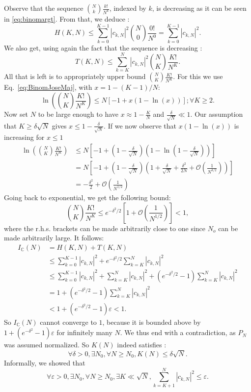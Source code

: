 \documentclass[aps,prl,showpacs,twocolumn]{revtex4-2}
\begin{document}
Observe that the sequence $\binom{N}{k}\frac{k!}{N^k}$, indexed by $k$, is decreasing as it can
be seen in \eqref{eq:binomargt}. From that, we deduce :
\[ H(K, N) \leq \sum_{k=0}^{K-1} |c_{k,N}|^2 \binom{N}{0} \frac{0!}{N^0} = \sum_{k=0}^{K-1} |c_{k,N}|^2.\]
We also get, using again the fact that the sequence is decreasing :
\[ T(K, N) \leq \sum_{k=K}^N |c_{k,N}|^2 \binom{N}{K} \frac{K!}{N^{K}}. \]
All that is left is to appropriately upper bound $\binom{N}{K} \frac{K!}{N^{K}}$. For this we use Eq.~\eqref{eq:BinomJoseMaj},
with $x = 1 - (K-1)/N$:
\[
    \ln \left( \binom{N}{K} \frac{K!}{N^K} \right) \leq N [ -1 + x(1 - \ln ( x )) ]; \forall K\geq 2.
\]
Now set $N$ to be large enough to have $x \approx 1 - \frac{K}{N}$ and $\frac{\delta}{\sqrt{N}} \ll 1$.
Our assumption that $K\geq \delta\sqrt{N}$ gives $x \leq 1 - \frac{\delta}{\sqrt{N}}$. If we now observe that $x(1-\ln(x))$ is increasing
for $x \leq 1$
\begin{align*}
    \ln \left( \binom{N}{K} \frac{K!}{N^{K}} \right)
    &\leq N \left[ -1 + \left( 1 - \frac{\delta}{\sqrt{N}} \right) \left( 1 - \ln \left(1 - \frac{\delta}{\sqrt{N}} \right) \right) \right]\\
    &= N \left[ -1 + \left( 1 - \frac{\delta}{\sqrt{N}} \right) \left( 1 + \frac{\delta}{\sqrt{N}} +\frac{\delta^2}{2N} +  \mathcal{O}\left(\frac{1}{N^{3/2}}\right)\right) \right]\\
    &= -\frac{\delta^2}{2} + \mathcal{O}\left(\frac{1}{N^{1/2}}\right)
\end{align*}
Going back to exponential, we get the following bound:
\[ \binom{N}{K} \frac{K!}{N^K} \leq e^{-\delta^2/2}\left[1+ \mathcal{O}\left(\frac{1}{N^{1/2}}\right)\right] < 1
,\]
where the r.h.s. brackets can be made arbitrarily close to one since $N_o$ can be made arbitrarily large. It follows:
\begin{align*}
    I_{\mathbb{C}}(N) &= H(K, N) + T(K, N)\\
    &\leq \sum_{k=0}^{K-1} |c_{k,N}|^2 + e^{-\delta^2/2} \sum_{k=K}^N |c_{k,N}|^2\\
    &\leq\sum_{k=0}^{K-1} |c_{k,N}|^2 + \sum_{k=K}^N |c_{k,N}|^2 + (e^{-\delta^2/2}-1) \sum_{k=K}^N |c_{k,N}|^2\\
    &= 1 + (e^{-\delta^2/2}-1) \sum_{k=K}^N |c_{k,N}|^2\\
    &< 1 + (e^{-\delta^2/2}-1) \varepsilon < 1.
\end{align*}
So $I_{\mathbb{C}}(N)$ cannot converge to $1$, because it is bounded above by $1 + (e^{-\delta^2}-1) \varepsilon$
for infinitely many $N$. We thus end with a contradiction, as $P_N$ was assumed normalized. So $K(N)$ indeed satisfies :
\[ \forall \delta > 0, \exists N_0, \forall N \geq N_0, K(N) \leq \delta \sqrt{N}. \]
Informally, we showed that
\[ \forall \varepsilon > 0, \exists N_0, \forall N \geq N_0, \exists K \ll \sqrt{N}, \sum_{k=K+1}^N |c_{k,N}|^2 \leq \varepsilon. \]
\end{document}
